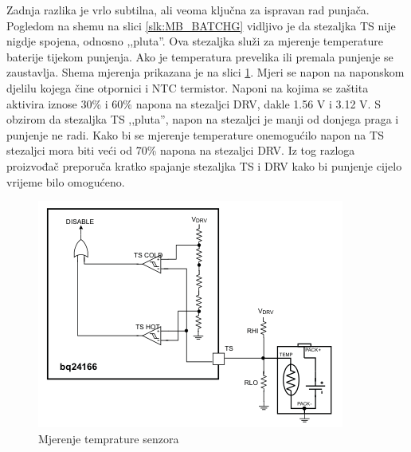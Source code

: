 Zadnja razlika je vrlo subtilna, ali veoma ključna za ispravan rad punjača. Pogledom na shemu na slici \ref{slk:MB_BATCHG} vidljivo je da stezaljka TS nije nigdje spojena, odnosno ,,pluta''. Ova stezaljka služi za mjerenje temperature baterije tijekom punjenja. Ako je temperatura prevelika ili premala punjenje se zaustavlja. Shema mjerenja prikazana je na slici \ref{slk:BATCHG_TS}. Mjeri se napon na naponskom djelilu kojega čine otpornici i NTC termistor. Naponi na kojima se zaštita aktivira iznose 30\% i 60\% napona na stezaljci DRV, dakle 1.56 V i 3.12 V. S obzirom da stezaljka TS ,,pluta'', napon na stezaljci je manji od donjega praga i punjenje ne radi. Kako bi se mjerenje temperature onemogućilo napon na TS stezaljci mora biti veći od 70\% napona na stezaljci DRV. Iz tog razloga proizvođač preporuča kratko spajanje stezaljka TS i DRV kako bi punjenje cijelo vrijeme bilo omogućeno.
\begin{figure}[htb]
    \centering
    \includegraphics[width=6 cm]{Figures/BATCHG_TS.png}
    \caption{Mjerenje temprature senzora}
    \label{slk:BATCHG_TS}
\end{figure}


